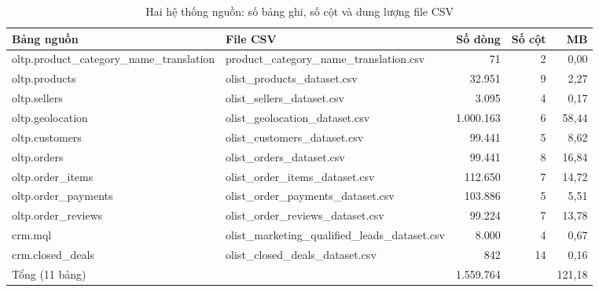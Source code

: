 \begin{table}[htbp]
\centering\small
\caption{Hai hệ thống nguồn: số bảng ghi, số cột và dung lượng file CSV}
\label{tab:src-tables}
\begin{tabular}{llrrr}
\toprule
\textbf{Bảng nguồn} & \textbf{File CSV} & \textbf{Số dòng} & \textbf{Số cột} & \textbf{MB} \\
\midrule
oltp.product\_category\_name\_translation & product\_category\_name\_translation.csv & 71 & 2 & 0,00 \\
oltp.products & olist\_products\_dataset.csv & 32.951 & 9 & 2,27 \\
oltp.sellers & olist\_sellers\_dataset.csv & 3.095 & 4 & 0,17 \\
oltp.geolocation & olist\_geolocation\_dataset.csv & 1.000.163 & 6 & 58,44 \\
oltp.customers & olist\_customers\_dataset.csv & 99.441 & 5 & 8,62 \\
oltp.orders & olist\_orders\_dataset.csv & 99.441 & 8 & 16,84 \\
oltp.order\_items & olist\_order\_items\_dataset.csv & 112.650 & 7 & 14,72 \\
oltp.order\_payments & olist\_order\_payments\_dataset.csv & 103.886 & 5 & 5,51 \\
oltp.order\_reviews & olist\_order\_reviews\_dataset.csv & 99.224 & 7 & 13,78 \\
crm.mql & olist\_marketing\_qualified\_leads\_dataset.csv & 8.000 & 4 & 0,67 \\
crm.closed\_deals & olist\_closed\_deals\_dataset.csv & 842 & 14 & 0,16 \\
Tổng (11 bảng) &  & 1.559.764 &  & 121,18 \\
\bottomrule
\end{tabular}
\end{table}
